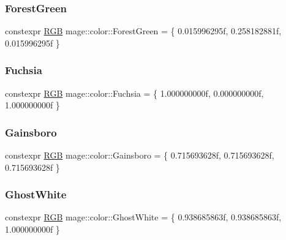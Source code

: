 \mbox{\label{namespacemage_1_1color_a9b90455f4354a6d6963486c472bc33be}} 
\subsubsection{\texorpdfstring{Forest\+Green}{ForestGreen}}
{\footnotesize\ttfamily constexpr \mbox{\hyperlink{structmage_1_1_r_g_b}{R\+GB}} mage\+::color\+::\+Forest\+Green = \{ 0.\+015996295f, 0.\+258182881f, 0.\+015996295f \}}

\mbox{\label{namespacemage_1_1color_a5a36bb041d4344c2111b15294ba0d15f}} 
\subsubsection{\texorpdfstring{Fuchsia}{Fuchsia}}
{\footnotesize\ttfamily constexpr \mbox{\hyperlink{structmage_1_1_r_g_b}{R\+GB}} mage\+::color\+::\+Fuchsia = \{ 1.\+000000000f, 0.\+000000000f, 1.\+000000000f \}}

\mbox{\label{namespacemage_1_1color_a1caedc498561f07c9ee98360cd32e0cf}} 
\subsubsection{\texorpdfstring{Gainsboro}{Gainsboro}}
{\footnotesize\ttfamily constexpr \mbox{\hyperlink{structmage_1_1_r_g_b}{R\+GB}} mage\+::color\+::\+Gainsboro = \{ 0.\+715693628f, 0.\+715693628f, 0.\+715693628f \}}

\mbox{\label{namespacemage_1_1color_a6e3a848fd12f965953fa38d355e20ab5}} 
\subsubsection{\texorpdfstring{Ghost\+White}{GhostWhite}}
{\footnotesize\ttfamily constexpr \mbox{\hyperlink{structmage_1_1_r_g_b}{R\+GB}} mage\+::color\+::\+Ghost\+White = \{ 0.\+938685863f, 0.\+938685863f, 1.\+000000000f \}}

